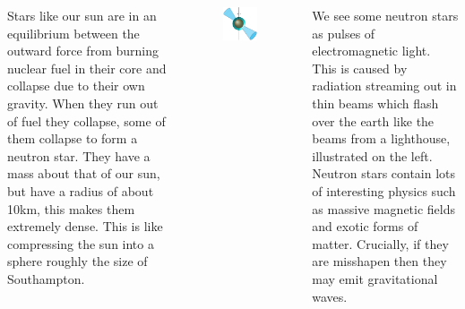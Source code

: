\documentclass[20pt, a1paper, portrait, margin=0mm, innermargin=10mm,
    titleinnersep=8mm,titletoblockverticalspace=0mm,blocktitleinnersep=8mm,
    blocktitlewidthratio=08, blocktitlemaxwidth=25cm ,blockbodyinnersep=8mm,
    blockverticalspace=10mm,colspace=5mm, subcolspace=0mm,noteinnersep=3mm]
    {tikzposter}
\begin{document}
\begin{columns}
{Stars like our sun are in an equilibrium between the outward force from burning
nuclear fuel in their core and collapse due to their own gravity.  When they
run out of fuel they collapse, some of them collapse to form a neutron star.
They have a mass about that of our sun, but have a radius of about 10km, this
makes them extremely dense. This is like compressing the sun into a sphere
roughly the size of Southampton.
\vspace{4mm}
\begin{figure}
    \vspace{-15mm}
\begin{tikzfigure}
\centering
\includegraphics[width=\linewidth]{img/star-crop}
\end{tikzfigure}
\end{figure}

We see some neutron stars as pulses of electromagnetic light. This is caused by
radiation streaming out in thin beams which flash over the earth like the
beams from a lighthouse, illustrated on the left.
Neutron stars contain lots of interesting physics such as massive magnetic
fields and exotic forms of matter. Crucially, if they are misshapen then they may
emit gravitational waves. 
\vspace{2mm}
}

\end{columns}
\end{document}
